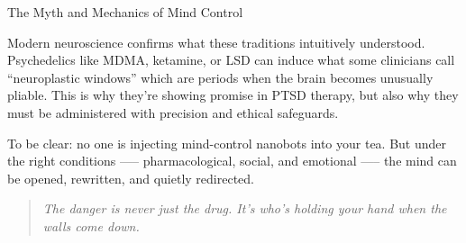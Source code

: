\begin{PsychologicalSidebar}{The Myth and Mechanics of Mind Control}
  \medskip
  
  Modern neuroscience confirms what these traditions intuitively understood. Psychedelics like MDMA, ketamine, or LSD 
  can induce what some clinicians call “neuroplastic windows” which are periods when the brain becomes unusually 
  pliable. This is why they’re showing promise in PTSD therapy, but also why they must be administered with 
  precision and ethical safeguards. 

  \medskip
  
  To be clear: no one is injecting mind-control nanobots into your tea. But under the right conditions 
  —-- pharmacological, social, and emotional —-- the mind can be opened, rewritten, and quietly 
  redirected.
  
  \begin{quote}
  \textit{The danger is never just the drug. It’s who’s holding your hand when the walls come down.}
  \end{quote}
  
\end{PsychologicalSidebar}

\medskip

